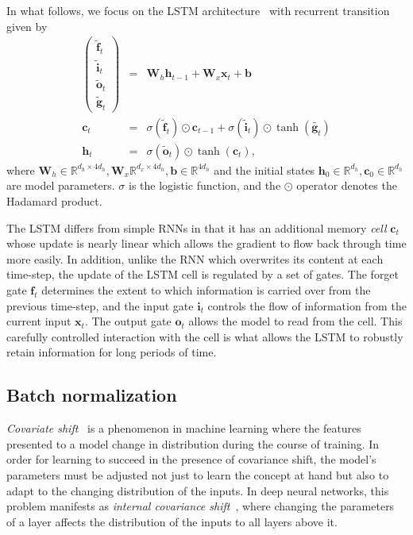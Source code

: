 \documentclass{article} %
\newcommand{\vect}[1]{\mathbf{#1}}
\newcommand{\mat}[1]{\mathbf{#1}}
\newcommand{\ewprod}{\odot}
\newcommand{\reals}{\mathbb{R}}
\begin{document}
In what follows, we focus on the LSTM architecture~\cite{lstm} with recurrent transition given by
\begin{eqnarray}
\left(\begin{array}{ccc}
\tilde{\vect{f}}_t \\
\tilde{\vect{i}}_t \\
\tilde{\vect{o}}_t \\
\tilde{\vect{g}}_t
\end{array}\right)
 &=&
 \mat{W}_h \vect{h}_{t-1} +
 \mat{W}_x \vect{x}_t +
 \vect{b}
 \\
\vect{c}_t &= &\sigma(\tilde{\vect{f}}_t) \ewprod \vect{c}_{t-1} +
\sigma(\tilde{\vect{i}}_t) \ewprod \tanh(\tilde{\vect{g}_t}) \\
\vect{h}_t &= &\sigma(\tilde{\vect{o}}_t) \ewprod \tanh(\vect{c}_t),
\end{eqnarray}
where $\vect{W}_h \in \reals^{d_h \times 4 d_h}, \vect{W}_x \reals^{d_x \times 4 d_h}, \vect{b} \in \reals^{4 d_h}$
and the initial states $\vect{h}_0 \in \reals^{d_h}, \vect{c}_0 \in \reals^{d_h}$ %
are model parameters.
$\sigma$ is the logistic function, and the $\ewprod$ operator denotes the Hadamard product.

The LSTM differs from simple RNNs in that it has an additional memory \emph{cell} $\vect{c}_t$ whose update is nearly linear which allows the gradient to flow back through time more easily.
In addition, unlike the RNN which overwrites its content at each time-step,
the update of the LSTM cell is regulated by a set of gates.
The forget gate $\vect{f}_t$ determines the extent to which information is carried over from the previous time-step,
and the input gate $\vect{i}_t$ controls the flow of information from the current input $\vect{x}_t$.
The output gate $\vect{o}_t$ allows the model to read from the cell.
This carefully controlled interaction with the cell is what allows the LSTM to robustly retain information for long periods of time.

\subsection{Batch normalization}

\emph{Covariate shift}~\cite{shimodaira2000improving} is a phenomenon in machine learning where
the features presented to a model change in distribution during the course of training.
In order for learning to succeed in the presence of covariance shift,
the model's parameters must be adjusted not just to learn the concept at hand
but also to adapt to the changing distribution of the inputs.
In deep neural networks, this problem manifests as \emph{internal covariance shift}~\cite{batchnorm},
where changing the parameters of a layer affects the distribution of the inputs to all layers above it.
\end{document}
